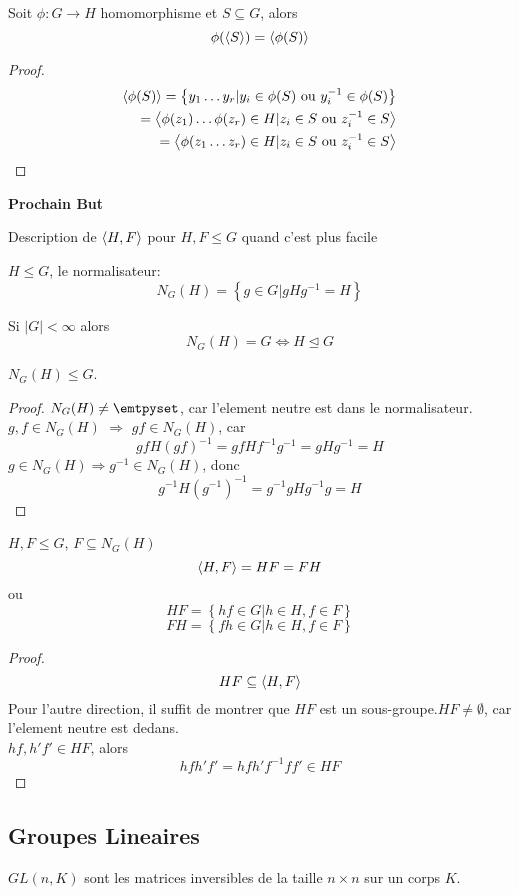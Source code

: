 \documentclass[../main.tex]{subfiles}
\begin{document}
\begin{crly}
Soit $\phi:G \to H$ homomorphisme et $S \subseteq G$, alors
\[ 
	\phi( \left\langle S\right\rangle)  = \left\langle\phi( S) \right\rangle
\]

\end{crly}
\begin{proof}
	\begin{align*}
		\left\langle\phi( S) \right\rangle = \left\{ y_1\ldots y_r | y_i \in \phi( S) \text{ ou } y ^{-1}_i \in \phi( S)  \right\} \\
		= \left\langle\phi( z_1) \ldots \phi( z_r) \in H | z_i \in S  \text{ ou } z_i^{-1}\in S\right\rangle\\
		= \left\langle\phi( z_1 \ldots z_r)  \in H | z_i \in S  \text{ ou } z_i^{-1}\in S\right\rangle\\
	\end{align*}
\end{proof}
\begin{center}
\textbf{Prochain But}
\end{center}
Description de $\left\langle H,F\right\rangle$ pour $H,F \leq G$ quand c'est plus facile
\begin{defn}
$H\leq G$, le normalisateur:
\[ 
	N_G( H) = \left\{ g \in G | gHg^{-1} = H \right\} 
\]

\end{defn}
\begin{rmq}
Si $|G| < \infty $ alors 
\[ 
	N_G ( H) = G \iff H \trianglelefteq G
\]

\end{rmq}
\begin{propo}
	$N_G( H) \leq G$.
\end{propo}
\begin{proof}
	$N_G( H) \neq \emtpyset$, car l'element neutre est dans le normalisateur.\\
	$g,f \in N_G( H) $ $\Rightarrow$ $gf \in N_G( H) $, car 
	\[ 
		gf H ( gf) ^{-1}= gf H f^{-1}g^{-1}= gHg^{-1}= H
	\]
	$g \in N_G( H) \Rightarrow g^{-1}\in N_G( H) $, donc
	\[ 
	g^{-1}H ( g^{-1} )^{-1}= g^{-1}g H g^{-1}g = H
	\]
	
\end{proof}
\begin{propo}
	$H,F \leq G$, $F\subseteq N_G( H) $ 
	\[ 
		\left\langle H,F\right\rangle = HF =FH
	\]
	ou
	\[ 
	HF = \left\{ hf \in G | h \in H, f \in F \right\} 
	\]
	\[ 
	FH = \left\{ fh \in G | h \in H, f \in F \right\} 
	\]
	
	
\end{propo}
\begin{proof}
\[ 
	HF \subseteq \left\langle H,F\right\rangle
\]
Pour l'autre direction, il suffit de montrer que $HF$ est un sous-groupe.$HF\neq \emptyset$, car l'element neutre est dedans.\\
$hf, h'f' \in HF$, alors
\[ 
hfh'f' = hfh'f^{-1}ff' \in HF
\]


\end{proof}
\subsection{Groupes Lineaires}
\begin{defn}
	$GL( n,K) $ sont les matrices inversibles de la taille $n\times n$ sur un corps $K$.
\end{defn}
\end{document}
